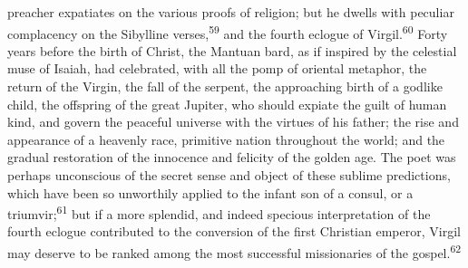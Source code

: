 preacher expatiates on the various proofs of religion; but he dwells
with peculiar complacency on the Sibylline verses,\textsuperscript{59} and the fourth
eclogue of Virgil.\textsuperscript{60} Forty years before the birth of Christ, the
Mantuan bard, as if inspired by the celestial muse of Isaiah, had
celebrated, with all the pomp of oriental metaphor, the return of the
Virgin, the fall of the serpent, the approaching birth of a godlike
child, the offspring of the great Jupiter, who should expiate the guilt
of human kind, and govern the peaceful universe with the virtues of his
father; the rise and appearance of a heavenly race, primitive nation
throughout the world; and the gradual restoration of the innocence and
felicity of the golden age. The poet was perhaps unconscious of the
secret sense and object of these sublime predictions, which have been
so unworthily applied to the infant son of a consul, or a triumvir;\textsuperscript{61}
but if a more splendid, and indeed specious interpretation of the
fourth eclogue contributed to the conversion of the first Christian
emperor, Virgil may deserve to be ranked among the most successful
missionaries of the gospel.\textsuperscript{62}


